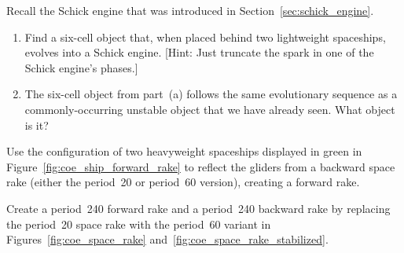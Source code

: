 \begin{multicols}{2}
	
	\mfilbreak
	
	
	\begin{problemstar}\label{exer:six_cell_schick} 
		Recall the Schick engine that was introduced in Section~\ref{sec:schick_engine}.\smallskip
		\begin{enumerate}[label=\bf\color{ocre}(\alph*)]
			\item Find a six-cell object that, when placed behind two lightweight spaceships, evolves into a Schick engine. [Hint: Just truncate the spark in one of the Schick engine's phases.]
			
			\item The six-cell object from part~(a) follows the same evolutionary sequence as a commonly-occurring unstable object that we have already seen. What object is it?
		\end{enumerate}
	\end{problemstar}
	
	
	\mfilbreak
	
	
	\begin{problemstar}\label{exer:back_to_forward_space_rake} 
		Use the configuration of two heavyweight spaceships displayed in green in Figure~\ref{fig:coe_ship_forward_rake} to reflect the gliders from a backward space rake (either the period~20 or period~60 version), creating a forward rake.
	\end{problemstar}
	
	
	\mfilbreak
	
	
	\begin{problem}\label{exer:p240_rake} 
		Create a period~240 forward rake and a period~240 backward rake by replacing the period~20 space rake with the period~60 variant in Figures~\ref{fig:coe_space_rake} and~\ref{fig:coe_space_rake_stabilized}.
	\end{problem}
	

\end{multicols}
